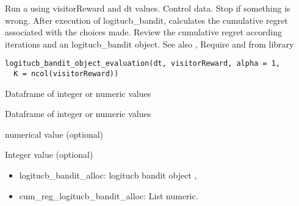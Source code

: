 \documentclass[letterpaper]{book}
\begin{document}
%
\begin{Description}\relax
Run a  using visitorReward and dt values.
Control data.
Stop if something is wrong.
After execution of logitucb\_bandit, calculates the cumulative regret
associated with the choices made.
Review the cumulative regret according iterations and an logitucb\_bandit object.
See also , 
Require  and  from  library
\end{Description}
%
\begin{Usage}
\begin{verbatim}
logitucb_bandit_object_evaluation(dt, visitorReward, alpha = 1,
  K = ncol(visitorReward))
\end{verbatim}
\end{Usage}
%
\begin{Arguments}
\begin{ldescription}
\item[\code{dt}] Dataframe of integer or numeric values

\item[\code{visitorReward}] Dataframe of integer or numeric values

\item[\code{alpha}] numerical value (optional)

\item[\code{K}] Integer value (optional)
\end{ldescription}
\end{Arguments}
%
\begin{Value}
\begin{itemize}
 List of element:
\item logitucb\_bandit\_alloc: logitucb bandit object ,
\item cum\_reg\_logitucb\_bandit\_alloc: List numeric.

\end{itemize}

\end{Value}
%
\end{document}
